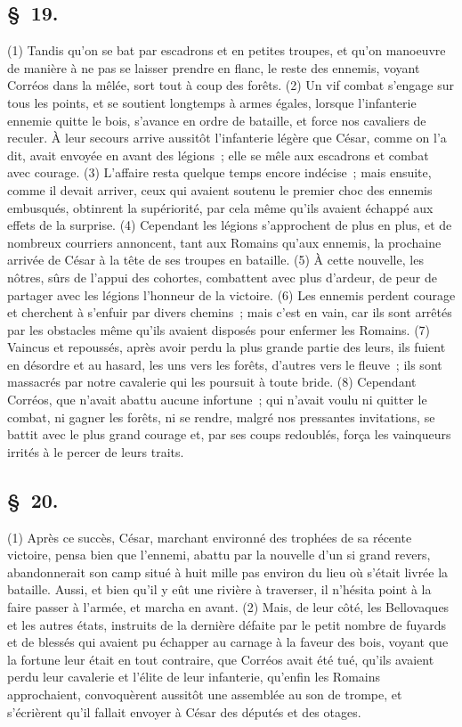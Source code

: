 \documentclass[french,twoside]{book} %
\begin{document}
\subsection[{§ 19.}]{ \textsc{§ 19.} }
\noindent (1) Tandis qu’on se bat par escadrons et en petites troupes, et qu’on manoeuvre de manière à ne pas se laisser prendre en flanc, le reste des ennemis, voyant Corréos dans la mêlée, sort tout à coup des forêts. (2) Un vif combat s’engage sur tous les points, et se soutient longtemps à armes égales, lorsque l’infanterie ennemie quitte le bois, s’avance en ordre de bataille, et force nos cavaliers de reculer. À leur secours arrive aussitôt l’infanterie légère que César, comme on l’a dit, avait envoyée en avant des légions ; elle se mêle aux escadrons et combat avec courage. (3) L'affaire resta quelque temps encore indécise ; mais ensuite, comme il devait arriver, ceux qui avaient soutenu le premier choc des ennemis embusqués, obtinrent la supériorité, par cela même qu’ils avaient échappé aux effets de la surprise. (4) Cependant les légions s’approchent de plus en plus, et de nombreux courriers annoncent, tant aux Romains qu’aux ennemis, la prochaine arrivée de César à la tête de ses troupes en bataille. (5) À cette nouvelle, les nôtres, sûrs de l’appui des cohortes, combattent avec plus d’ardeur, de peur de partager avec les légions l’honneur de la victoire. (6) Les ennemis perdent courage et cherchent à s’enfuir par divers chemins ; mais c’est en vain, car ils sont arrêtés par les obstacles même qu’ils avaient disposés pour enfermer les Romains. (7) Vaincus et repoussés, après avoir perdu la plus grande partie des leurs, ils fuient en désordre et au hasard, les uns vers les forêts, d’autres vers le fleuve ; ils sont massacrés par notre cavalerie qui les poursuit à toute bride. (8) Cependant Corréos, que n’avait abattu aucune infortune ; qui n’avait voulu ni quitter le combat, ni gagner les forêts, ni se rendre, malgré nos pressantes invitations, se battit avec le plus grand courage et, par ses coups redoublés, força les vainqueurs irrités à le percer de leurs traits.
\subsection[{§ 20.}]{ \textsc{§ 20.} }
\noindent (1) Après ce succès, César, marchant environné des trophées de sa récente victoire, pensa bien que l’ennemi, abattu par la nouvelle d’un si grand revers, abandonnerait son camp situé à huit mille pas environ du lieu où s’était livrée la bataille. Aussi, et bien qu’il y eût une rivière à traverser, il n’hésita point à la faire passer à l’armée, et marcha en avant. (2) Mais, de leur côté, les Bellovaques et les autres états, instruits de la dernière défaite par le petit nombre de fuyards et de blessés qui avaient pu échapper au carnage à la faveur des bois, voyant que la fortune leur était en tout contraire, que Corréos avait été tué, qu’ils avaient perdu leur cavalerie et l’élite de leur infanterie, qu’enfin les Romains approchaient, convoquèrent aussitôt une assemblée au son de trompe, et s’écrièrent qu’il fallait envoyer à César des députés et des otages.
\end{document}
